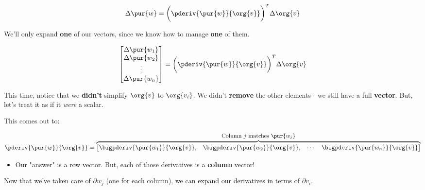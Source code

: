         \begin{equation}
            \Delta \pur{w}
            =
            \bigg(
                \pderiv{ \pur{w} }{ \org{v} } 
            \bigg)^T
            \Delta \org{v}
        \end{equation}
        
        We'll only expand \textbf{one} of our vectors, since we know how to manage \textbf{one} of them.
        
        \begin{equation}
            \begin{bmatrix}
                \Delta \pur{w_1}\\ \Delta \pur{w_2}\\ \vdots \\ \Delta \pur{w_n}
            \end{bmatrix}
            =
            \bigg(
                \pderiv{ \pur{w} }{ \org{v} } 
            \bigg)^T
            \Delta \org{v}
        \end{equation}
        
        This time, notice that we \textbf{didn't} simplify $\org{v}$ to $\org{v_i}$. We didn't \textbf{remove} the other elements - we still have a full \textbf{vector}. But, let's treat it as if it \textit{were} a scalar. 
        
        This comes out to:
        
        \begin{equation}
            \pderiv{ \pur{w} }{ \org{v} } 
            =
            \overbrace{
                \begin{bmatrix}
                    \bigpderiv{ \pur{w_1} }{ \org{v} }, &
                    \bigpderiv{ \pur{w_2} }{ \org{v} }, &
                    \cdots &
                    \bigpderiv{ \pur{w_n} }{ \org{v} } 
                \end{bmatrix}
            }^{ \text{\small Column $j$ matches $\pur{w_j}$} }
        \end{equation}
        
        \begin{itemize}
            \item Our "answer" is a row vector. But, each of those derivatives is a \textbf{column} vector!
        \end{itemize}
        
        Now that we've taken care of $\partial w_j$ (one for each column), we can expand our derivatives in terms of $\partial v_i$.
        
